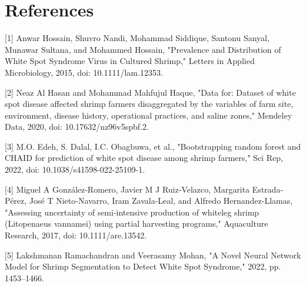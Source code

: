 \documentclass[journal,comsoc]{IEEEtran}
\begin{document}
\section*{References}

[1] Anwar Hossain, Shuvro Nandi, Mohammad Siddique, Santonu Sanyal, Munawar Sultana, and Mohammed Hossain, "Prevalence and Distribution of White Spot Syndrome Virus in Cultured Shrimp," Letters in Applied Microbiology, 2015, doi: 10.1111/lam.12353.

[2] Neaz Al Hasan and Mohammad Mahfujul Haque, "Data for: Dataset of white spot disease affected shrimp farmers disaggregated by the variables of farm site, environment, disease history, operational practices, and saline zones," Mendeley Data, 2020, doi: 10.17632/nz96v5spbf.2.

[3] M.O. Edeh, S. Dalal, I.C. Obagbuwa, et al., "Bootstrapping random forest and CHAID for prediction of white spot disease among shrimp farmers," Sci Rep, 2022, doi: 10.1038/s41598-022-25109-1.

[4] Miguel A González‐Romero, Javier M J Ruiz‐Velazco, Margarita Estrada‐Pérez, José T Nieto‐Navarro, Iram Zavala‐Leal, and Alfredo Hernandez‐Llamas, "Assessing uncertainty of semi‐intensive production of whiteleg shrimp (Litopenaeus vannamei) using partial harvesting programs," Aquaculture Research, 2017, doi: 10.1111/are.13542.

[5] Lakshmanan Ramachandran and Veerasamy Mohan, "A Novel Neural Network Model for Shrimp Segmentation to Detect White Spot Syndrome," 2022, pp. 1453–1466.
\end{document}
